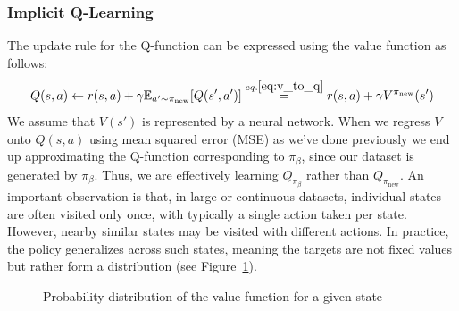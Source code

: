 \subsubsection{Implicit Q-Learning}
The update rule for the Q-function can be expressed using the value function as follows:
$$Q(s,a) \gets r(s,a)+\gamma \mathbb{E}_{a'\sim \pi_\text{new}}
[Q(s',a')]\overset{eq. \eqref{eq:v_to_q}}{=} r(s,a)+\gamma V^{\pi_\text{new}}(s')$$ 
We assume that $V(s') $ is represented by a neural network. When we regress $ V $ onto $ Q(s, a) $ 
using mean squared error (MSE) as we've done previously we end up approximating the Q-function 
corresponding to $ \pi_\beta $, since our dataset is generated by $ \pi_\beta $. Thus, we are effectively learning 
$ Q_{\pi_\beta} $ rather than $ Q_{\pi_\text{new}} $.\newline
An important observation is that, in large or continuous datasets, individual states are often visited only once, with 
typically a single action taken per state. However, nearby similar states may be visited with different actions. In practice, 
the policy generalizes across such states, meaning the targets are not fixed values but rather form a distribution (see 
Figure~\ref{v_value_dist}).
\begin{figure}[H]
    \centering
\caption{Probability distribution of the value function for a given state}
\label{v_value_dist}
\end{figure}
